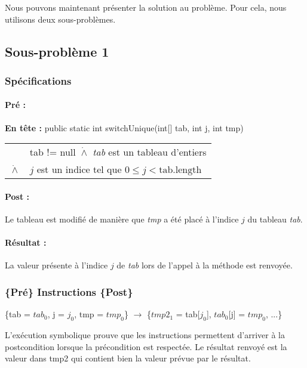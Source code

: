 Nous pouvons maintenant présenter la solution au problème. Pour cela, nous utilisons deux sous-problèmes. 
\subsection{Sous-problème 1}

\subsubsection*{Spécifications}

\paragraph{Pré :}
\noindent \textbf{En tête :} public static int switchUnique(int[] tab, int j, int tmp) \\
\begin{tabular}{ll}
  & tab != null  $\dot{\wedge}$ \textit{tab} est un tableau d'entiers \\
  $\dot{\wedge}$ & $j$ est un indice tel que $0 \le j < \mathrm{tab.length}$
\end{tabular}

\paragraph{Post :}

Le tableau est modifié de manière que \textit{tmp} a été placé à l'indice $j$ du tableau \textit{tab}.

\paragraph{Résultat :}

La valeur présente à l'indice $j$ de \textit{tab} lors de l'appel à la méthode est renvoyée.

\subsubsection*{ \{Pré\} Instructions \{Post\} }

\{tab = $tab_{0}$, j = $j_{0}$, tmp = $tmp_{0}$\} $\rightarrow$ \{$tmp2_{1}$ = tab[$j_{0}$], $tab_{0}$[j] = $tmp_{0}$, ...\}

L'exécution symbolique prouve que les instructions permettent d'arriver à la postcondition lorsque la précondition est respectée. Le résultat renvoyé est la valeur dans tmp2 qui contient bien la valeur prévue par le résultat.

